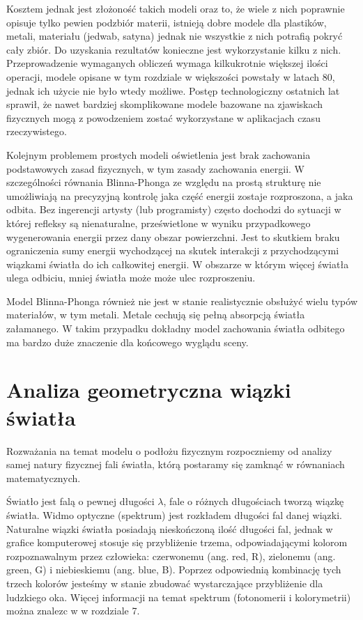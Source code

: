 \documentclass[../main.tex]{subfiles}
\begin{document}
Kosztem jednak jest złożoność takich modeli oraz to, że wiele z nich poprawnie 
opisuje tylko pewien podzbiór materii, istnieją dobre modele dla plastików, 
metali, materiału (jedwab, satyna) jednak nie wszystkie z nich potrafią pokryć
cały zbiór. Do uzyskania rezultatów konieczne jest wykorzystanie kilku z nich.
Przeprowadzenie wymaganych obliczeń wymaga kilkukrotnie
większej ilości operacji, modele opisane w tym rozdziale w większości powstały
w latach 80, jednak ich użycie nie było wtedy możliwe. Postęp technologiczny 
ostatnich lat sprawił, że nawet bardziej skomplikowane
modele bazowane na zjawiskach fizycznych mogą z powodzeniem zostać wykorzystane
w aplikacjach czasu rzeczywistego.

Kolejnym problemem prostych modeli oświetlenia jest brak zachowania
podstawowych zasad fizycznych, w tym zasady zachowania energii. W szczególności
równania Blinna-Phonga ze względu na prostą strukturę nie umożliwiają na
precyzyjną kontrolę jaka część energii zostaje rozproszona, a jaka odbita. Bez
ingerencji artysty (lub programisty) często dochodzi do sytuacji w której
refleksy są nienaturalne, prześwietlone w wyniku przypadkowego wygenerowania 
energii przez dany obszar powierzchni. Jest to skutkiem braku ograniczenia 
sumy energii wychodzącej na skutek interakcji z przychodzącymi wiązkami światła 
do ich całkowitej energii. W obszarze w którym więcej światła ulega odbiciu, mniej
światła może może ulec rozproszeniu.

Model Blinna-Phonga również nie jest w stanie realistycznie obsłużyć wielu
typów materiałów, w tym metali. Metale cechują się pełną absorpcją światła
załamanego. W takim przypadku dokładny model zachowania światła odbitego ma
bardzo duże znaczenie dla końcowego wyglądu sceny.

\section{Analiza geometryczna wiązki światła}

Rozważania na temat modelu o podłożu fizycznym rozpoczniemy od analizy samej natury fizycznej fali światła, którą postaramy się zamknąć w równaniach matematycznych. 

Światło jest falą o pewnej długości $\lambda$, fale o różnych długościach tworzą
wiązkę światła. Widmo optyczne (spektrum) jest rozkładem długości fal danej
wiązki. Naturalne wiązki światła posiadają nieskończoną ilość długości fal,
jednak w grafice komputerowej stosuje się przybliżenie trzema, 
odpowiadającymi kolorom rozpoznawalnym przez człowieka: czerwonemu (ang. red, R), zielonemu (ang. green, G) i niebieskiemu (ang. blue, B). Poprzez odpowiednią kombinację tych trzech kolorów jesteśmy w stanie zbudować wystarczające przybliżenie dla ludzkiego oka. Więcej informacji na temat spektrum (fotonomerii i kolorymetrii) można znalezc w \cite{RealTimeRendering2008} w rozdziale 7.
\end{document}

